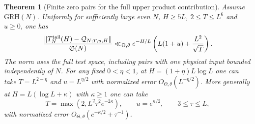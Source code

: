 \documentclass[11pt,a4paper]{article}
\numberwithin{equation}{section}
\newtheorem{theorem}{Theorem}[section]
\newcommand{\SSS}{\mathfrak S}
\newcommand{\grh}{\mathrm{GRH}}
\begin{document}
\begin{theorem}[Finite zero pairs for the full upper product contribution]
\label{thm:upperfinitezeros}
Assume $\grh(N)$. Uniformly for sufficiently large even $N$,
$H\ge5L$, $2\le T\le L^6$ and $u\ge0$, one has
\begin{equation}
 \frac{\|T_N^{\rm tail}(H)-\mathcal Q_{N;T,u,H}\|}{\SSS(N)}
 \ll_{\Theta,\theta} e^{-H/L}
           \left(L(1+u)+\frac{L^2}{\sqrt T}\right).
 \label{eq:upperfinitezeros}
\end{equation}
The norm uses the full test space, including pairs with
one physical input bounded independently of $N$.
For any fixed $0<\eta<1$, at $H=(1+\eta)L\log L$ one can
take $T=L^{2-\eta}$ and $u=L^{\eta/2}$ with normalized
error $O_{\Theta,\theta}(L^{-\eta/2})$.
More generally at $H=L(\log L+\kappa)$ with $\kappa\ge1$
one can take
\[
 T=\max(2,L^2\tau^2e^{-2\kappa}),\qquad u=e^{\kappa/2},
 \qquad 3\le\tau\le L,
\]
with normalized error $O_{\Theta,\theta}(e^{-\kappa/2}+\tau^{-1})$.
\end{theorem}
\end{document}
